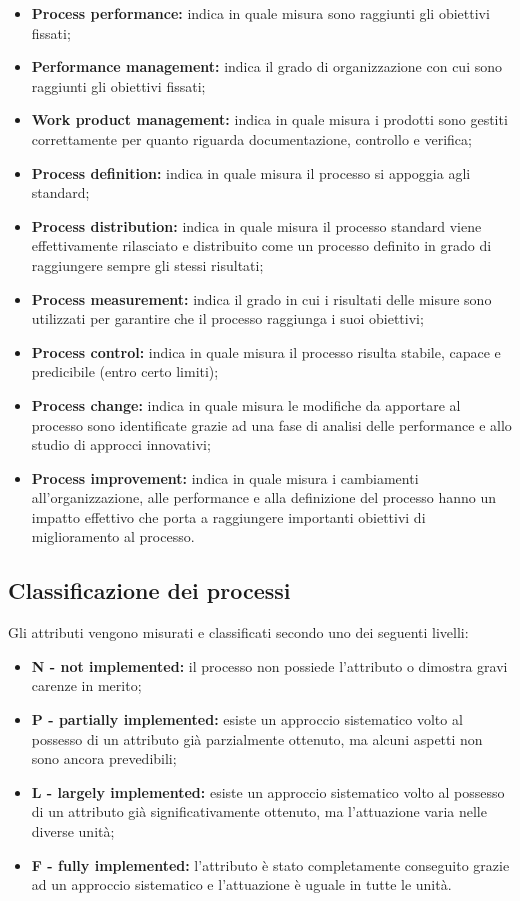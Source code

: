 \documentclass[openany,12pt,a4paper]{report}
\begin{document}
\begin{itemize}
    \item \textbf{Process performance:} indica in quale misura sono raggiunti gli obiettivi fissati;
    \item \textbf{Performance management:} indica il grado di organizzazione con cui sono raggiunti gli obiettivi fissati;
    \item \textbf{Work product management:} indica in quale misura i prodotti sono gestiti correttamente per quanto riguarda documentazione, controllo e verifica;
    \item \textbf{Process definition:} indica in quale misura il processo si appoggia agli standard; 
    \item \textbf{Process distribution:} indica in quale misura il processo standard viene effettivamente rilasciato e distribuito come un processo definito in grado di raggiungere sempre gli stessi risultati;
    \item \textbf{Process measurement:} indica il grado in cui i risultati delle misure sono utilizzati per garantire che il processo raggiunga i suoi obiettivi;
    \item \textbf{Process control:} indica in quale misura il processo risulta stabile, capace e predicibile (entro certo limiti);
    \item \textbf{Process change:} indica in quale misura le modifiche da apportare al processo sono identificate grazie ad una fase di analisi delle performance e allo studio di approcci innovativi;
    \item \textbf{Process improvement:} indica in quale misura i cambiamenti all'organizzazione, alle performance e alla definizione del processo hanno un impatto effettivo che porta a raggiungere importanti obiettivi di miglioramento al processo.
\end{itemize}

\subsection{Classificazione dei processi}

Gli attributi vengono misurati e classificati secondo uno dei seguenti livelli:

\begin{itemize}
    \item \textbf{N - not implemented:} il processo non possiede l'attributo o dimostra gravi carenze in merito;
    \item \textbf{P - partially implemented:} esiste un approccio sistematico volto al possesso di un attributo già parzialmente ottenuto, ma alcuni aspetti non sono ancora prevedibili;
    \item \textbf{L - largely implemented:} esiste un approccio sistematico volto al possesso di un attributo già significativamente ottenuto, ma l'attuazione varia nelle diverse unità;
    \item \textbf{F - fully implemented:} l'attributo è stato completamente conseguito grazie ad un approccio sistematico e l'attuazione è uguale in tutte le unità.
\end{itemize}
\end{document}
